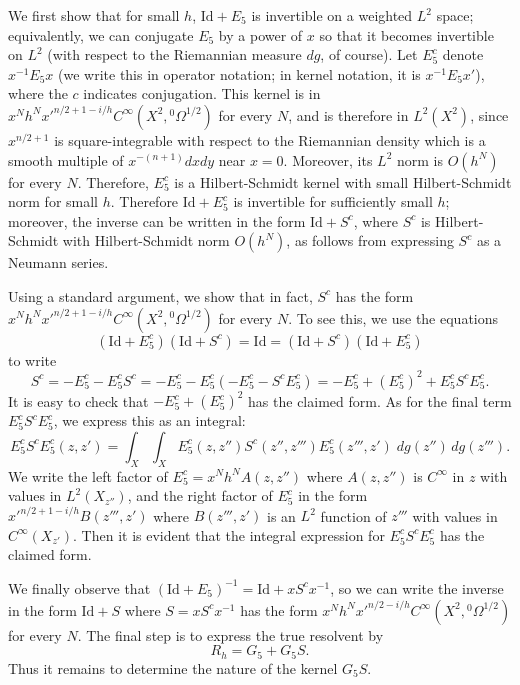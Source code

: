 \documentclass[10pt, a4paper, twoside]{amsart}
\numberwithin{equation}{section}
\theoremstyle{remark}
\begin{document}
We first show that for small $h$, ${\mathrm{Id}} + E_5$ is invertible on a weighted $L^2$ space; equivalently, we can conjugate $E_5$ by a power of $x$ so that it becomes invertible on $L^2$ (with respect to the Riemannian measure $dg$, of course). Let $E_5^c$ denote $x^{-1}  E_5  x$ (we write this in operator notation; in kernel notation, it is $x^{-1} E_5 x'$), where the $c$ indicates conjugation. This kernel is in $x^N h^N {x'}^{n/2+1-i/h} C^\infty(X^2, {{}^0\Omega^{1/2}})$ for every $N$, and is therefore in $L^2(X^2)$, since $x^{n/2+1}$ is square-integrable with respect to the Riemannian density which is a smooth multiple of $x^{-(n+1)} dx dy$ near $x=0$. Moreover, its $L^2$ norm is $O(h^N)$ for every $N$. Therefore, $E_5^c$ is a Hilbert-Schmidt kernel with small Hilbert-Schmidt norm for small $h$. Therefore ${\mathrm{Id}} + E_5^c$ is invertible for sufficiently small $h$; moreover, the inverse can be written in the form ${\mathrm{Id}} + S^c$, where $S^c$ is Hilbert-Schmidt   with Hilbert-Schmidt norm $O(h^N)$, as follows from expressing $S^c$ as a  Neumann series. 

Using a standard argument, we show that in fact, $S^c$ has the form $x^N h^N {x'}^{n/2+1 -i/h} C^\infty(X^2, {{}^0\Omega^{1/2}})$ for every $N$. To see this, we use the equations 
$$
({\mathrm{Id}} + E_5^c)({\mathrm{Id}} + S^c) = {\mathrm{Id}} = ({\mathrm{Id}} + S^c)({\mathrm{Id}} + E_5^c)
$$
to write
$$
S^c = - E_5^c - E_5^cS^c = - E_5^c - E_5^c(- E_5^c - S^cE_5^c) = -E_5^c + (E_5^c)^2 + E_5^cS^cE_5^c. 
$$
It is easy to check that $ -E_5^c + (E_5^c)^2$ has the claimed form. As for the final term $E_5^cS^cE_5^c$, we express this as an integral:
$$
E_5^cS^cE_5^c(z, z') = \int_X \int_X E_5^c(z, z'') S^c(z'', z''') E_5^c(z''', z') \; dg(z'') \, dg(z'''). 
$$
We write the left factor of $E_5^c = x^N h^N A(z, z'')$ where $A(z, z'')$ is $C^\infty$ in $z$ with values in $L^2(X_{z''})$, and the right factor of $E_5^c$ in the form ${x'}^{n/2 + 1 -i/h} B(z''', z')$ where $B(z''', z')$ is an $L^2$ function of $z'''$ with values in $C^\infty(X_{z'})$. Then it is evident that the integral expression for $E_5^cS^cE_5^c$ has the claimed form. 

We finally observe that $({\mathrm{Id}} + E_5)^{-1} = {\mathrm{Id}} + x S^c x^{-1}$, so we can write the inverse in the form ${\mathrm{Id}} + S$ where $S = x S^c x^{-1}$ has the form $x^N h^N {x'}^{n/2 -i/h} C^\infty(X^2, {{}^0\Omega^{1/2}})$ for every $N$. The final step is to express the true resolvent by
$$
R_h = G_5 + G_5 S.
$$
Thus it remains to determine the nature of the kernel $G_5 S$. 
\end{document}
